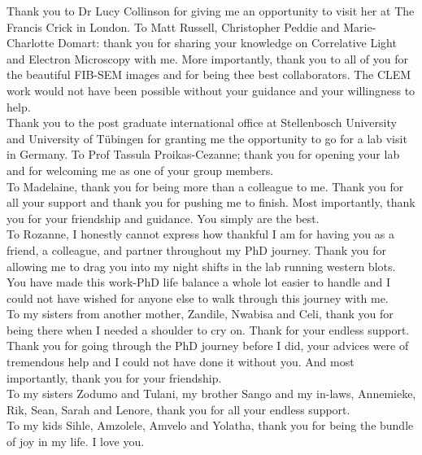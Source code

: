 \noindent
Thank you to Dr Lucy Collinson for giving me an opportunity to visit her at The Francis Crick in London. To Matt Russell, Christopher Peddie and Marie-Charlotte Domart: thank you for sharing your knowledge on Correlative Light and Electron Microscopy with me. More importantly, thank you to all of you for the beautiful FIB-SEM images and for being thee best collaborators. The CLEM work would not have been possible without your guidance and your willingness to help. \\

\noindent
Thank you to the post graduate international office at Stellenbosch University and University of T{\"u}bingen for granting me the opportunity to go for a lab visit in Germany. To Prof Tassula Proikas-Cezanne; thank you for opening your lab and for welcoming me as one of your group members.\\

\noindent
To Madelaine, thank you for being more than a colleague to me. Thank you for all your support and thank you for pushing me to finish. Most importantly, thank you for your friendship and guidance. You simply are the best.\\

\noindent
To Rozanne, I honestly cannot express how thankful I am for having you as a friend, a colleague, and partner throughout my PhD journey. Thank you for allowing me to drag you into my night shifts in the lab running western blots. You have made this work-PhD life balance a whole lot easier to handle and I could not have wished for anyone else to walk through this journey with me.\\

\noindent
To my sisters from another mother, Zandile, Nwabisa and Celi, thank you for being there when I needed a shoulder to cry on. Thank for your endless support. Thank you for going through the PhD journey before I did, your advices were of tremendous help and I could not have done it without you. And most importantly, thank you for your friendship.\\

\noindent
To my sisters Zodumo and Tulani, my brother Sango and my in-laws, Annemieke, Rik, Sean, Sarah and Lenore, thank you for all your endless support.\\

\noindent
To my kids Sihle, Amzolele, Amvelo and Yolatha, thank you for being the bundle of  joy in my life. I love you.\\

